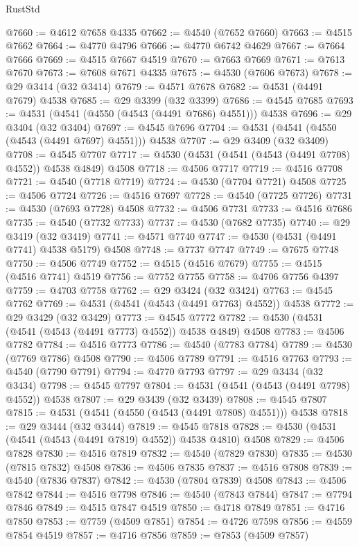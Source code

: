 \begin{lexlean}{RustStd}
\begin{coremodule}
@7660 := @4612 @7658 @4335
@7662 := @4540 (@7652 @7660)
@7663 := @4515 @7662
@7664 := @4770 @4796
@7666 := @4770 @6742 @4629
@7667 := @7664 @7666
@7669 := @4515 @7667 @4519
@7670 := @7663 @7669
@7671 := @7613 @7670
@7673 := @7608 @7671 @4335
@7675 := @4530 (@7606 @7673)
@7678 := @29 @3414 (@32 @3414)
@7679 := @4571 @7678
@7682 := @4531 (@4491 @7679) @4538
@7685 := @29 @3399 (@32 @3399)
@7686 := @4545 @7685
@7693 := @4531 (@4541 (@4550 (@4543 (@4491 @7686) @4551))) @4538
@7696 := @29 @3404 (@32 @3404)
@7697 := @4545 @7696
@7704 := @4531 (@4541 (@4550 (@4543 (@4491 @7697) @4551))) @4538
@7707 := @29 @3409 (@32 @3409)
@7708 := @4545 @7707
@7717 := @4530 (@4531 (@4541 (@4543 (@4491 @7708) @4552)) @4538 @4849) @4508
@7718 := @4506 @7717
@7719 := @4516 @7708
@7721 := @4540 (@7718 @7719)
@7724 := @4530 (@7704 @7721) @4508
@7725 := @4506 @7724
@7726 := @4516 @7697
@7728 := @4540 (@7725 @7726)
@7731 := @4530 (@7693 @7728) @4508
@7732 := @4506 @7731
@7733 := @4516 @7686
@7735 := @4540 (@7732 @7733)
@7737 := @4530 (@7682 @7735)
@7740 := @29 @3419 (@32 @3419)
@7741 := @4571 @7740
@7747 := @4530 (@4531 (@4491 @7741) @4538 @5179) @4508
@7748 := @7737 @7747
@7749 := @7675 @7748
@7750 := @4506 @7749
@7752 := @4515 (@4516 @7679)
@7755 := @4515 (@4516 @7741) @4519
@7756 := @7752 @7755
@7758 := @4706 @7756 @4397
@7759 := @4703 @7758
@7762 := @29 @3424 (@32 @3424)
@7763 := @4545 @7762
@7769 := @4531 (@4541 (@4543 (@4491 @7763) @4552)) @4538
@7772 := @29 @3429 (@32 @3429)
@7773 := @4545 @7772
@7782 := @4530 (@4531 (@4541 (@4543 (@4491 @7773) @4552)) @4538 @4849) @4508
@7783 := @4506 @7782
@7784 := @4516 @7773
@7786 := @4540 (@7783 @7784)
@7789 := @4530 (@7769 @7786) @4508
@7790 := @4506 @7789
@7791 := @4516 @7763
@7793 := @4540 (@7790 @7791)
@7794 := @4770 @7793
@7797 := @29 @3434 (@32 @3434)
@7798 := @4545 @7797
@7804 := @4531 (@4541 (@4543 (@4491 @7798) @4552)) @4538
@7807 := @29 @3439 (@32 @3439)
@7808 := @4545 @7807
@7815 := @4531 (@4541 (@4550 (@4543 (@4491 @7808) @4551))) @4538
@7818 := @29 @3444 (@32 @3444)
@7819 := @4545 @7818
@7828 := @4530 (@4531 (@4541 (@4543 (@4491 @7819) @4552)) @4538 @4810) @4508
@7829 := @4506 @7828
@7830 := @4516 @7819
@7832 := @4540 (@7829 @7830)
@7835 := @4530 (@7815 @7832) @4508
@7836 := @4506 @7835
@7837 := @4516 @7808
@7839 := @4540 (@7836 @7837)
@7842 := @4530 (@7804 @7839) @4508
@7843 := @4506 @7842
@7844 := @4516 @7798
@7846 := @4540 (@7843 @7844)
@7847 := @7794 @7846
@7849 := @4515 @7847 @4519
@7850 := @4718 @7849
@7851 := @4716 @7850
@7853 := @7759 (@4509 @7851)
@7854 := @4726 @7598
@7856 := @4559 @7854 @4519
@7857 := @4716 @7856
@7859 := @7853 (@4509 @7857)

\end{coremodule}
\end{lexlean}

